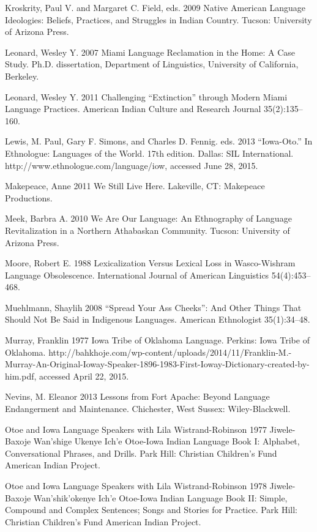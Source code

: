 \documentclass[output=paper]{LSP/langsci}
\begin{document}
\begin{reflist}
Kroskrity, Paul V. and Margaret C. Field, eds. 2009 Native American Language Ideologies: Beliefs, Practices, and Struggles in Indian Country. Tucson: University of Arizona Press.

Leonard, Wesley Y. 2007 Miami Language Reclamation in the Home: A Case Study. Ph.D. dissertation, Department of Linguistics, University of California, Berkeley.

Leonard, Wesley Y. 2011 Challenging ``Extinction'' through Modern Miami Language Practices. American Indian Culture and Research Journal 35(2):135--160.

Lewis, M. Paul, Gary F. Simons, and Charles D. Fennig. eds. 2013 ``Iowa-Oto.'' In Ethnologue: Languages of the World. 17th edition. Dallas: SIL International. http://www.ethnologue.com/language/iow, accessed June 28, 2015.

Makepeace, Anne 2011 We Still Live Here. Lakeville, CT: Makepeace Productions.

Meek, Barbra A. 2010 We Are Our Language: An Ethnography of Language Revitalization in a Northern Athabaskan Community. Tucson: University of Arizona Press.

Moore, Robert E. 1988 Lexicalization Versus Lexical Loss in Wasco-Wishram Language Obsolescence. International Journal of American Linguistics 54(4):453--468.

Muehlmann, Shaylih 2008 ``Spread Your Ass Cheeks'': And Other Things That Should Not Be Said in Indigenous Languages. American Ethnologist 35(1):34--48.

Murray, Franklin 1977 Iowa Tribe of Oklahoma Language. Perkins: Iowa Tribe of Oklahoma. http://bahkhoje.com/wp-content/uploads/2014/11/Franklin-M.-Murray-An-Original-Ioway-Speaker-1896-1983-First-Ioway-Dictionary-created-by-him.pdf, accessed April 22, 2015.

Nevins, M. Eleanor 2013 Lessons from Fort Apache: Beyond Language Endangerment and Maintenance. Chichester, West Sussex: Wiley-Blackwell.

Otoe and Iowa Language Speakers with Lila Wistrand-Robinson 1977 Jiwele-Baxoje Wan'shige Ukenye Ich'e Otoe-Iowa Indian Language Book I: Alphabet, Conversational Phrases, and Drills. Park Hill: Christian Children's Fund American Indian Project.

Otoe and Iowa Language Speakers with Lila Wistrand-Robinson 1978 Jiwele-Baxoje Wan'shik'okenye Ich'e Otoe-Iowa Indian Language Book II: Simple, Compound and Complex Sentences; Songs and Stories for Practice. Park Hill: Christian Children's Fund American Indian Project.


\end{reflist}
\end{document}
